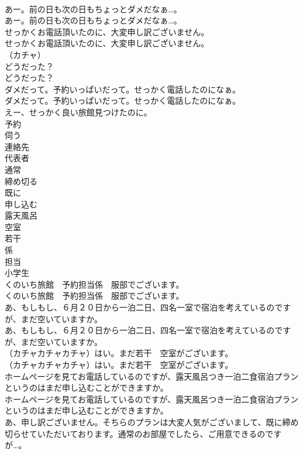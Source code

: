 \documentclass[8pt]{extreport}
\begin{document}
\begin{CJK}{UTF8}{min}
\\	あー。前の日も次の日もちょっとダメだなぁ…。	
\\	あー。前の日も次の日もちょっとダメだなぁ…。 
\\	せっかくお電話頂いたのに、大変申し訳ございません。	
\\	せっかくお電話頂いたのに、大変申し訳ございません。 
\\	（カチャ）	
\\	どうだった？	
\\	どうだった？ 
\\	ダメだって。予約いっぱいだって。せっかく電話したのになぁ。	
\\	ダメだって。予約いっぱいだって。せっかく電話したのになぁ。 
\\	えー、せっかく良い旅館見つけたのに。	
\\	予約
\\	伺う
\\	連絡先
\\	代表者
\\	通常
\\	締め切る
\\	既に
\\	申し込む
\\	露天風呂
\\	空室
\\	若干
\\	係
\\	担当
\\	小学生
\\	くのいち旅館　予約担当係　服部でございます。	
\\	くのいち旅館　予約担当係　服部でございます。 
\\	あ、もしもし、６月２０日から一泊二日、四名一室で宿泊を考えているのですが、まだ空いていますか。	
\\	あ、もしもし、６月２０日から一泊二日、四名一室で宿泊を考えているのですが、まだ空いていますか。 
\\	（カチャカチャカチャ）はい。まだ若干　空室がございます。	
\\	（カチャカチャカチャ）はい。まだ若干　空室がございます。 
\\	ホームページを見てお電話しているのですが、露天風呂つき一泊二食宿泊プランというのはまだ申し込むことができますか。	
\\	ホームページを見てお電話しているのですが、露天風呂つき一泊二食宿泊プランというのはまだ申し込むことができますか。 
\\	あ、申し訳ございません。そちらのプランは大変人気がございまして、既に締め切らせていただいております。通常のお部屋でしたら、ご用意できるのですが…。	

\end{CJK}
\end{document}
